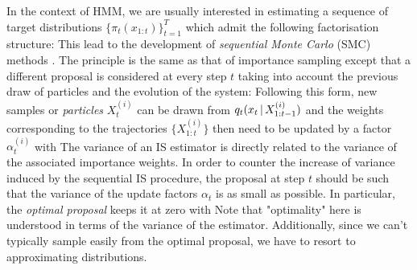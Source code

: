 In the context of HMM, we are usually interested in estimating a sequence of target distributions $\{\pi_{t}(x_{1:t})\}_{t=1}^{T}$ which admit the following factorisation structure:
%
%
This lead to the development of \emph{sequential Monte Carlo} (SMC) methods \citep[chapter 14.3]{robert04}. The principle is the same as that of importance sampling except that a different proposal is considered at every step $t$ taking into account the previous draw of particles and the evolution of the system:
%
%
Following this form, new samples or \emph{particles} $X^{(i)}_t$ can be drawn from $q_{t}(x_{t}\,|\, X^{(i)}_{1:t-1})$ and the weights corresponding to the trajectories $\{X^{(i)}_{1:t}\}$ then need to be updated by a factor $\alpha^{(i)}_{t}$ with
%
%
The variance of an IS estimator is directly related to the variance of the associated importance weights. In order to counter the increase of variance induced by the sequential IS procedure, the proposal at step $t$ should be such that the variance of the update factors $\alpha_t$ is as small as possible. In particular, the \emph{optimal proposal} \citep{doucet11} keeps it at zero with
Note that "optimality" here is understood in terms of the variance of the estimator. Additionally, since we can't typically sample easily from the optimal proposal, we have to resort to approximating distributions. 

